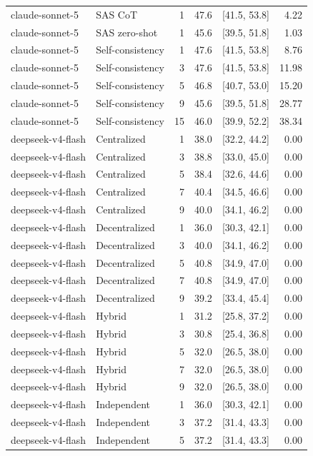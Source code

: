 \begin{tabular}{@{}llrrrr@{}}
claude-sonnet-5 & SAS CoT & 1 & 47.6 & [41.5, 53.8] & 4.22 \\
claude-sonnet-5 & SAS zero-shot & 1 & 45.6 & [39.5, 51.8] & 1.03 \\
claude-sonnet-5 & Self-consistency & 1 & 47.6 & [41.5, 53.8] & 8.76 \\
claude-sonnet-5 & Self-consistency & 3 & 47.6 & [41.5, 53.8] & 11.98 \\
claude-sonnet-5 & Self-consistency & 5 & 46.8 & [40.7, 53.0] & 15.20 \\
claude-sonnet-5 & Self-consistency & 9 & 45.6 & [39.5, 51.8] & 28.77 \\
claude-sonnet-5 & Self-consistency & 15 & 46.0 & [39.9, 52.2] & 38.34 \\
deepseek-v4-flash & Centralized & 1 & 38.0 & [32.2, 44.2] & 0.00 \\
deepseek-v4-flash & Centralized & 3 & 38.8 & [33.0, 45.0] & 0.00 \\
deepseek-v4-flash & Centralized & 5 & 38.4 & [32.6, 44.6] & 0.00 \\
deepseek-v4-flash & Centralized & 7 & 40.4 & [34.5, 46.6] & 0.00 \\
deepseek-v4-flash & Centralized & 9 & 40.0 & [34.1, 46.2] & 0.00 \\
deepseek-v4-flash & Decentralized & 1 & 36.0 & [30.3, 42.1] & 0.00 \\
deepseek-v4-flash & Decentralized & 3 & 40.0 & [34.1, 46.2] & 0.00 \\
deepseek-v4-flash & Decentralized & 5 & 40.8 & [34.9, 47.0] & 0.00 \\
deepseek-v4-flash & Decentralized & 7 & 40.8 & [34.9, 47.0] & 0.00 \\
deepseek-v4-flash & Decentralized & 9 & 39.2 & [33.4, 45.4] & 0.00 \\
deepseek-v4-flash & Hybrid & 1 & 31.2 & [25.8, 37.2] & 0.00 \\
deepseek-v4-flash & Hybrid & 3 & 30.8 & [25.4, 36.8] & 0.00 \\
deepseek-v4-flash & Hybrid & 5 & 32.0 & [26.5, 38.0] & 0.00 \\
deepseek-v4-flash & Hybrid & 7 & 32.0 & [26.5, 38.0] & 0.00 \\
deepseek-v4-flash & Hybrid & 9 & 32.0 & [26.5, 38.0] & 0.00 \\
deepseek-v4-flash & Independent & 1 & 36.0 & [30.3, 42.1] & 0.00 \\
deepseek-v4-flash & Independent & 3 & 37.2 & [31.4, 43.3] & 0.00 \\
deepseek-v4-flash & Independent & 5 & 37.2 & [31.4, 43.3] & 0.00 \\

\end{tabular}
